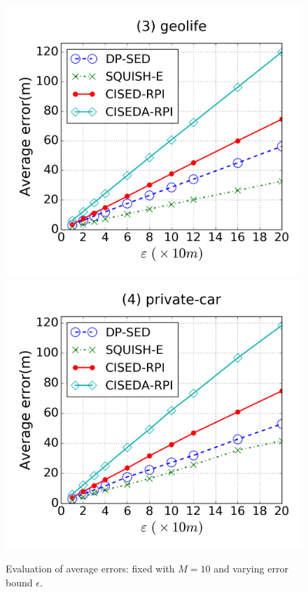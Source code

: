 {\begin{figure}[tb]
\includegraphics[scale = 0.250]{figures/Exp-error-epsilon-geolife.png}
\includegraphics[scale = 0.250]{figures/Exp-error-epsilon-private.png}
\vspace{-3ex}
\caption{\small Evaluation of average errors: fixed with $M=10$ and varying error bound $\epsilon$.}
\label{fig:ae-m10}
\vspace{-1ex}
\end{figure}
}



